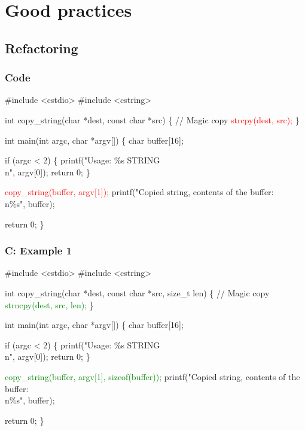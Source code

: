 \documentclass[usenames,dvipsnames]{beamer}
\newcommand{\greenalert}[1] {\alert{\textcolor{green}{#1}}}
\newcommand{\redalert}[1] {\alert{\textcolor{red}{#1}}}
\begin{document}
\section{Good practices}
\subsection{Refactoring}

\begin{frame}[fragile]
\frametitle{Code}
\tiny
\begin{semiverbatim}
\#include <cstdio>
\#include <cstring>

int copy\_string(char *dest, const char *src) \{
  // Magic copy 
  \redalert{strcpy(dest, src);}
\}

int main(int argc, char *argv[]) \{ 
  char buffer[16];

  if (argc < 2) \{
    printf("Usage: \%s STRING\\n", argv[0]);
    return 0;
  \}

  \redalert{copy\_string(buffer, argv[1]);}
  printf("Copied string, contents of the buffer:\\n\%s", buffer);

  return 0;
\}
\end{semiverbatim}
\end{frame}

\begin{frame}[fragile]
\frametitle{C: Example 1}
\tiny
\begin{semiverbatim}
\#include <cstdio>
\#include <cstring>

int copy\_string(char *dest, const char *src, size\_t len) \{
  // Magic copy
  \greenalert{strncpy(dest, src, len);}
\}

int main(int argc, char *argv[]) \{
  char buffer[16];

  if (argc < 2) \{
    printf("Usage: \%s STRING\\n", argv[0]);
    return 0;
  \}

  \greenalert{copy\_string(buffer, argv[1], sizeof(buffer));}
  printf("Copied string, contents of the buffer:\\n\%s", buffer);

  return 0;
\}
\end{semiverbatim}
\end{frame}
\end{document}
